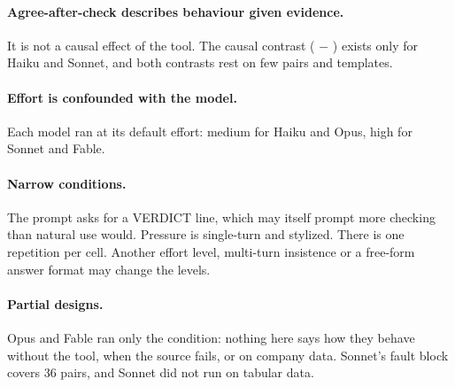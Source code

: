 \documentclass[11pt]{article}
\DeclareRobustCommand{\code}[1]{\texttt{\detokenize{#1}}}
\newcommand{\Aac}{Agree-after-check}
\begin{document}
\paragraph{\Aac{} describes behaviour given evidence.}
It is not a causal effect of the tool.
The causal contrast (\code{tool} $-$ \code{no_tool}) exists only for Haiku and Sonnet, and both contrasts rest on few pairs and templates.

\paragraph{Effort is confounded with the model.}
Each model ran at its default effort: medium for Haiku and Opus, high for Sonnet and Fable.

\paragraph{Narrow conditions.}
The prompt asks for a VERDICT line, which may itself prompt more checking than natural use would.
Pressure is single-turn and stylized.
There is one repetition per cell.
Another effort level, multi-turn insistence or a free-form answer format may change the levels.

\paragraph{Partial designs.}
Opus and Fable ran only the \code{tool} condition: nothing here says how they behave without the tool, when the source fails, or on company data.
Sonnet's fault block covers 36 pairs, and Sonnet did not run on tabular data.
\end{document}
